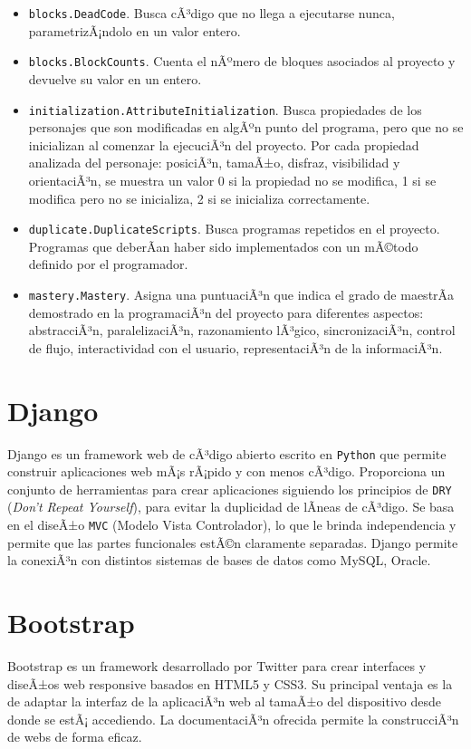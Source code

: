 \documentclass[a4paper, 12pt]{book}
\begin{document}
\begin{itemize}
  \item \texttt{blocks.DeadCode}.
  Busca cÃ³digo que no llega a ejecutarse nunca, parametrizÃ¡ndolo en un valor entero.
  \item \texttt{blocks.BlockCounts}.
  Cuenta el nÃºmero de bloques asociados al proyecto y devuelve su valor en un entero.
  \item \texttt{initialization.AttributeInitialization}.
  Busca propiedades de los personajes que son modificadas en algÃºn punto del programa,
  pero que no se inicializan al comenzar la 	ejecuciÃ³n del proyecto. Por cada propiedad
  analizada del personaje: posiciÃ³n, tamaÃ±o, 	disfraz, visibilidad y orientaciÃ³n, se
  muestra un valor 0 si la propiedad no se modifica, 	1 si se modifica pero no se inicializa,
  2 si se inicializa correctamente.
  \item \texttt{duplicate.DuplicateScripts}.
  Busca programas repetidos en el proyecto. Programas que deberÃ­an haber sido implementados
  con un mÃ©todo definido por el programador.
  \item \texttt{mastery.Mastery}.
  Asigna una puntuaciÃ³n que indica el grado de maestrÃ­a demostrado en la programaciÃ³n del
  proyecto para diferentes aspectos: abstracciÃ³n, paralelizaciÃ³n, razonamiento lÃ³gico,
  sincronizaciÃ³n, control de flujo, interactividad con el usuario, representaciÃ³n de la informaciÃ³n.
	
	
\end{itemize}


\section{Django}
\label{sec:seccion4}
Django es un framework web de cÃ³digo abierto escrito en \texttt{Python} que permite construir aplicaciones
web mÃ¡s rÃ¡pido y con menos cÃ³digo. Proporciona un conjunto de herramientas para crear aplicaciones
siguiendo los principios de \texttt{DRY} (\emph{Don't Repeat Yourself}), para evitar la duplicidad de lÃ­neas de cÃ³digo.
Se basa en el diseÃ±o \texttt{MVC} (Modelo Vista Controlador), lo que le brinda independencia y permite que
las partes funcionales estÃ©n claramente separadas.
Django permite la conexiÃ³n con distintos sistemas de bases de datos como MySQL, Oracle.



\section{Bootstrap}
\label{sec:seccion5}
Bootstrap es un framework desarrollado por Twitter para crear interfaces y diseÃ±os web responsive
basados en HTML5 y CSS3. Su principal ventaja es la de adaptar la interfaz de la aplicaciÃ³n web
al tamaÃ±o del dispositivo desde donde se estÃ¡ accediendo. La documentaciÃ³n ofrecida permite la
construcciÃ³n de webs de forma eficaz.
\end{document}
